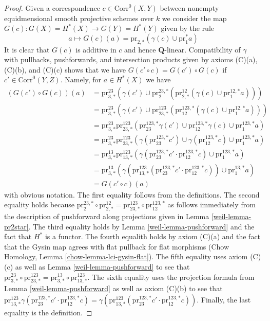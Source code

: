 \begin{proof}
\medskip\noindent
Given a correspondence $c \in \text{Corr}^0(X, Y)$ between
nonempty equidmensional smooth projective schemes over $k$
we consider the map $G(c) : G(X) = H^*(X) \to G(Y) = H^*(Y)$
given by the rule
$$
a \longmapsto
G(c)(a) = \text{pr}_{2, *}(\gamma(c) \cup \text{pr}_1^*a)
$$
It is clear that $G(c)$ is additive in $c$ and hence $\mathbf{Q}$-linear.
Compatibility of $\gamma$ with pullbacks, pushforwards, and
intersection products given by axioms (C)(a), (C)(b), and (C)(c)
shows that we have
$G(c' \circ c) = G(c') \circ G(c)$ if $c' \in \text{Corr}^0(Y, Z)$.
Namely, for $a \in H^*(X)$ we have
\begin{align*}
(G(c') \circ G(c))(a)
& =
\text{pr}^{23}_{3, *}(\gamma(c') \cup
\text{pr}^{23, *}_2(\text{pr}^{12}_{2, *}(\gamma(c) \cup
\text{pr}^{12, *}_1a))) \\
& =
\text{pr}^{23}_{3, *}(\gamma(c') \cup
\text{pr}^{123}_{23, *}(\text{pr}^{123, *}_{12}(\gamma(c) \cup
\text{pr}^{12, *}_1 a))) \\
& =
\text{pr}^{23}_{3, *}
\text{pr}^{123}_{23, *}(
\text{pr}^{123, *}_{23}\gamma(c') \cup
\text{pr}^{123, *}_{12}\gamma(c) \cup
\text{pr}^{123, *}_1 a) \\
& =
\text{pr}^{23}_{3, *}
\text{pr}^{123}_{23, *}(
\gamma(\text{pr}^{123, *}_{23}c') \cup
\gamma(\text{pr}^{123, *}_{12}c) \cup
\text{pr}^{123, *}_1 a) \\
& =
\text{pr}^{13}_{3, *}
\text{pr}^{123}_{13, *}(
\gamma(\text{pr}^{123, *}_{23}c' \cdot \text{pr}^{123, *}_{12}c) \cup
\text{pr}^{123, *}_1 a) \\
& =
\text{pr}^{13}_{3, *}(
\gamma(\text{pr}^{123}_{13, *}(\text{pr}^{123, *}_{23}c' \cdot
\text{pr}^{123, *}_{12}c)) \cup
\text{pr}^{13, *}_1 a) \\
& =
G(c' \circ c)(a)
\end{align*}
with obvious notation. The first equality follows from the definitions.
The second equality holds because
$\text{pr}^{23, *}_2 \circ \text{pr}^{12}_{2, *} =
\text{pr}^{123}_{23, *} \circ \text{pr}^{123, *}_{12}$
as follows immediately from the description of pushforward
along projections given in Lemma \ref{weil-lemma-pr2star}.
The third equality holds by Lemma \ref{weil-lemma-pushforward}
and the fact that $H^*$ is a functor.
The fourth equalith holds by axiom (C)(a) and the fact that
the Gysin map agrees with flat pullback for flat morphisms
(Chow Homology, Lemma \ref{chow-lemma-lci-gysin-flat}).
The fifth equality uses axiom (C)(c) as well as
Lemma \ref{weil-lemma-pushforward} to see that
$\text{pr}^{23}_{3, *} \circ \text{pr}^{123}_{23, *} =
\text{pr}^{13}_{3, *} \circ \text{pr}^{123}_{13, *}$.
The sixth equality uses the projection formula from
Lemma \ref{weil-lemma-pushforward} as well as
axiom (C)(b) to see that $
\text{pr}^{123}_{13, *}
\gamma(\text{pr}^{123, *}_{23}c' \cdot \text{pr}^{123, *}_{12}c) =
\gamma(\text{pr}^{123}_{13, *}(
\text{pr}^{123, *}_{23}c' \cdot \text{pr}^{123, *}_{12}c))$.
Finally, the last equality is the definition.


\end{proof}
